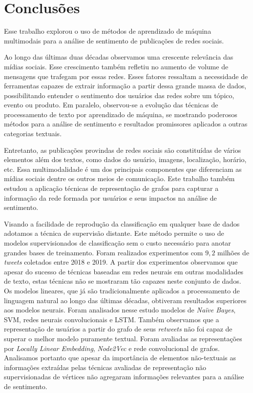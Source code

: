 \chapter{Conclusões}
\label{chapter:conclusion}

Esse trabalho explorou o uso de métodos de aprendizado de máquina multimodais
para a análise de sentimento de publicações de redes sociais.

Ao longo das últimas duas décadas observamos uma crescente relevância das mídias
sociais.
Esse crescimento também refletiu no aumento de volume de mensagens que
trafegam por essas redes.
Esses fatores ressaltam a necessidade de ferramentas capazes de extrair
informação a partir dessa grande massa de dados, possibilitando entender o
sentimento dos usuários das redes sobre um tópico, evento ou produto.
Em paralelo, observou-se a evolução das técnicas de processamento de texto por
aprendizado de máquina, se mostrando poderosos métodos para a análise de
sentimento e resultados promissores aplicados a outras categorias textuais.

Entretanto, as publicações provindas de redes sociais são constituídas de vários
elementos além dos textos, como dados do usuário, imagens, localização, horário,
etc.
Essa multimodalidade é um dos principais componentes que diferenciam as mídias
sociais dentre os outros meios de comunicação.
Este trabalho também estudou a aplicação técnicas de representação de grafos para
capturar a informação da rede formada por usuários e seus impactos na análise de
sentimento.

Visando a facilidade de reprodução da classificação em qualquer base de dados
adotamos a técnica de supervisão distante.
Este método permite o uso de modelos supervisionados de classificação sem o
custo necessário para anotar grandes bases de treinamento.
Foram realizados experimentos com $9,2$ milhões de \textit{tweets} coletados
entre 2018 e 2019.
A partir dos experimentos observamos que apesar do sucesso de técnicas baseadas
em redes neurais em outras modalidades de texto, estas técnicas não se mostraram
tão capazes neste conjunto de dados.
Os modelos lineares, que já são tradicionalmente aplicados a processamento de
linguagem natural ao longo das últimas décadas, obtiveram resultados superiores aos
modelos neurais.
Foram analisados nesse estudo modelos de \textit{Naïve Bayes}, SVM, redes
neurais convolucionais e LSTM.
Também observamos que a representação de usuários a partir do grafo de seus
\textit{retweets} não foi capaz de superar o melhor modelo puramente textual.
Foram avaliadas as representações por \textit{Locally Linear Embedding},
\textit{Node2Vec} e rede convolucional de grafos.
Analisamos portanto que apesar da importância de elementos não-textuais as
informações extraídas pelas técnicas avaliadas de representação não
supervisionadas de vértices não agregaram informações relevantes para a análise
de sentimento.


